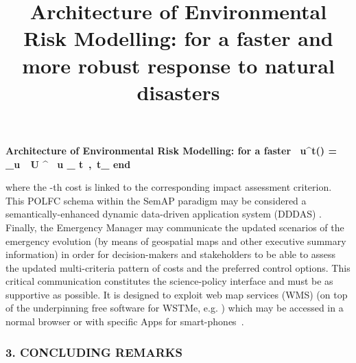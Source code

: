 \documentclass[12pt]{article}
\title{Architecture of Environmental Risk Modelling: for a faster and more robust response to natural disasters}
\begin{document}
\begin{center}


{\large{\bf Architecture of Environmental Risk Modelling: for a faster\
\label{eq:multicriteria_policy}
u^t(\cdot) = {}_{u\, \in \,{ U }^{ \, u }_{ t\, ,\, t_{ { end } } }} 


\noindent where {the -th} cost  is linked to the corresponding impact assessment criterion. {This POLFC schema within the SemAP paradigm may be considered a semantically-enhanced dynamic data-driven application system (DDDAS) \cite{de_Rigo_etal_IFIP2013,DiLeo_etal_2013,RodriguezAseretto_etal_2013}.} Finally, the Emergency Manager may communicate the updated scenarios of the emergency evolution (by means of geospatial maps and other executive summary information) in order for decision-makers and stakeholders to be able to assess the updated multi-criteria pattern of costs and the preferred control options. 
This critical communication constitutes the science-policy interface and must be as supportive as possible. It is designed to exploit web map services (WMS) \cite{McInerney2012,Bastin2012} (on top of the underpinning free software for WSTMe, e.g. \cite{RodriguezAseretto_EFDAC2013}) which may be accessed in a normal browser or with specific Apps for smart-phones~\cite{Aseretto_submitted}. 


\medskip
\subsubsection*{3. CONCLU{DING} REMARKS}
\smallskip

}}
\end{center}
\end{document}
